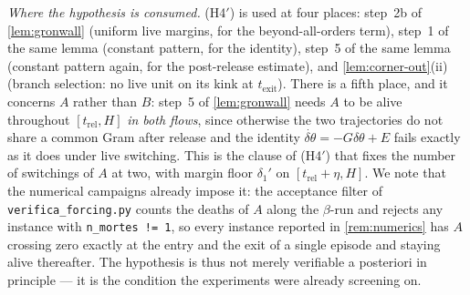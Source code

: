 \documentclass[11pt]{article}
\theoremstyle{definition}
\theoremstyle{remark}
\newcommand{\texit}{t_{\mathrm{exit}}}
\newcommand{\trel}{t_{\mathrm{rel}}}
\begin{document}
\begin{enumerate}
\emph{Where the hypothesis is consumed.} (H4$'$) is used at four places: step~2b
of \cref{lem:gronwall} (uniform live margins, for the beyond-all-orders term),
step~1 of the same lemma (constant pattern, for the identity), step~5 of the same
lemma (constant pattern again, for the post-release estimate), and
\cref{lem:corner-out}(ii) (branch selection: no live unit on its kink at
$\texit$). There is a fifth place, and it concerns $A$ rather than $B$: step~5 of
\cref{lem:gronwall} needs $A$ to be alive throughout $[\trel,H]$ \emph{in both
flows}, since otherwise the two trajectories do not share a common Gram after
release and the identity $\dot{\delta\theta}=-G\delta\theta+E$ fails exactly as
it does under live switching. This is the clause of (H4$'$) that fixes the number
of switchings of $A$ at two, with margin floor $\delta_1'$ on
$[\trel+\eta,H]$. We note that the numerical campaigns already impose it: the
acceptance filter of \texttt{verifica\_forcing.py} counts the deaths of $A$ along
the $\beta$-run and rejects any instance with \verb|n_mortes != 1|, so every
instance reported in \cref{rem:numerics} has $A$ crossing zero exactly at the
entry and the exit of a single episode and staying alive thereafter. The
hypothesis is thus not merely verifiable a posteriori in principle --- it is the
condition the experiments were already screening on.


\end{enumerate}
\end{document}
